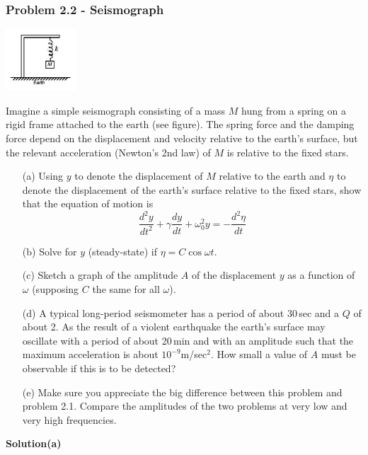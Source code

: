 \documentclass[12pt,a4paper]{article}
\begin{document}
\subsubsection*{Problem 2.2 - Seismograph}
\begin{floatingfigure}[r]{0.25\textwidth}
\vspace{-1em} %
\centering
\includegraphics[width=0.2\textwidth]{figs/fig_prob_2.2.png}
\end{floatingfigure}
Imagine a simple seismograph consisting of a mass $M$ hung from a
spring on a rigid frame attached to the earth (see figure). The spring force and the damping force depend on the displacement and velocity relative to the earth’s surface, but the relevant acceleration (Newton’s 2nd law) of $M$ is relative to the fixed stars.
\vspace{0.4cm}
\begin{enumerate}
    \item[(a)]Using $y$ to denote the displacement of $M$ relative to the earth and $\eta$ to denote the displacement of the earth’s surface relative to the fixed stars, show that the equation of motion is
    \[\frac{d^2y}{dt^2}+\gamma\frac{dy}{dt}+\omega_0^2y=-\frac{d^2\eta}{dt}\]
    \item[(b)]Solve for $y$ (steady-state) if $\eta=C\cos\omega t$.
    \item[(c)]Sketch a graph of the amplitude $A$ of the displacement $y$ as a function of $\omega$ (supposing $C$ the same for all $\omega$).
    \item[(d)]A typical long-period seismometer has a period of about 30\,sec and a $Q$ of about 2. As the result of a violent earthquake the earth’s surface may oscillate with a period of about 20\,min and with an amplitude such that the maximum acceleration is about $10^{-9}$m/sec$^2$. How small a value of $A$ must be observable if this is to be detected?
    \item[(e)]Make sure you appreciate the big difference between this problem and problem 2.1. Compare the amplitudes of the two problems at very low and very high frequencies. 
\end{enumerate}
\par
\textbf{Solution(a)}
\\
\end{document}
